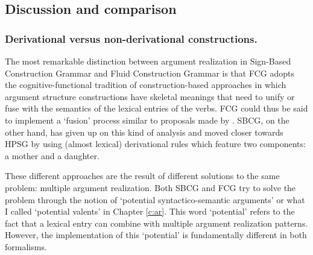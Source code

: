 \subsection{Discussion and comparison}
\label{s:active-passive}

\subsubsection{Derivational versus non-derivational constructions.}

The most remarkable distinction between argument realization in Sign-Based Construction Grammar and Fluid Construction Grammar is that FCG adopts the cognitive-functional tradition of construction-based approaches in which argument structure constructions have skeletal meanings that need to unify or fuse with the semantics of the lexical entries of the verbs. FCG could thus be said to implement a `fusion' process similar to proposals made by \citet{goldberg95construction}. SBCG, on the other hand, has given up on this kind of analysis and moved closer towards HPSG by using (almost lexical) derivational rules which feature two components: a mother and a daughter.

These different approaches are the result of different solutions to the same problem: multiple argument realization. Both SBCG and FCG try to solve the problem through the notion of `potential syntactico-semantic arguments' \citep{sag07sbcg} or what I called `potential valents' in Chapter \ref{c:ar}. This word `potential' refers to the fact that a lexical entry can combine with multiple argument realization patterns. However, the implementation of this `potential' is fundamentally different in both formalisms.

